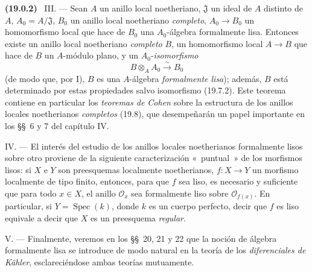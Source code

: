 \documentclass[10pt,oneside]{book}
\makeatletter
\newcommand{\setmanualcurrentlabel}[1]{\def\@currentlabel{#1}}
\newenvironment{env}[1][]{\setmanualcurrentlabel{#1}\par\medskip\noindent\textbf{(#1)}\ }{\par}
\makeatother
\begin{document}
\begin{env}[19.0.2]
\medskip\noindent III. --- Sean $A$ un anillo local noetheriano,
$\mathfrak J$ un ideal de $A$ distinto de $A$, $A_0=A/\mathfrak J$, $B_0$ un
anillo local noetheriano \emph{completo}, $A_0\to B_0$ un homomorfismo local
que hace de $B_0$ una $A_0$-álgebra formalmente lisa. Entonces existe un
anillo local noetheriano \emph{completo} $B$, un homomorfismo local $A\to B$
que hace de $B$ un $A$-módulo plano, y un $A_0$-\emph{isomorfismo}
\[
  B\otimes_A A_0\xrightarrow{\sim}B_0
\]
(de modo que, por I), $B$ es una $A$-álgebra \emph{formalmente lisa}); además,
$B$ está determinado por estas propiedades salvo isomorfismo (19.7.2). Este
teorema contiene en particular los \emph{teoremas de Cohen} sobre la estructura
de los anillos locales noetherianos \emph{completos} (19.8), que desempeñarán un papel
importante en los §§~6 y 7 del capítulo IV.

\medskip\noindent IV. --- El interés del estudio de los anillos locales
noetherianos formalmente lisos sobre otro proviene de la siguiente caracterización
«~puntual~» de los morfismos lisos: si $X$ e $Y$ son
preesquemas localmente noetherianos, $f:X\to Y$ un morfismo localmente de tipo
finito, entonces, para que $f$ sea liso, es necesario y suficiente que para todo
$x\in X$, el anillo $\mathcal O_x$ sea formalmente liso sobre
$\mathcal O_{f(x)}$. En particular, si $Y=\operatorname{Spec}(k)$, donde $k$ es
un cuerpo perfecto, decir que $f$ es liso equivale a decir que $X$ es un
preesquema \emph{regular}.

\medskip\noindent V. --- Finalmente, veremos en los §§~20, 21 y 22 que
la noción de álgebra formalmente lisa se introduce de modo natural en la
teoría de los \emph{diferenciales de Kähler}, esclareciéndose ambas teorías
mutuamente.
\end{env}
\end{document}
